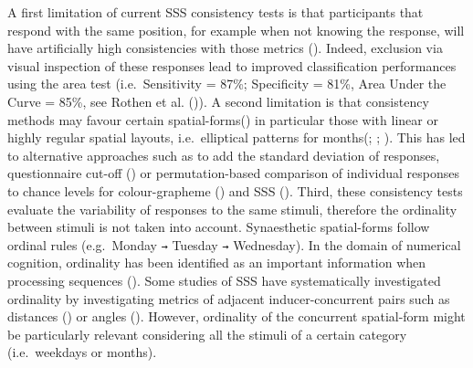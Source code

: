 \documentclass[
  man,
  floatsintext,
  longtable,
  a4paper,
  nolmodern,
  notxfonts,
  notimes,
  colorlinks=true,linkcolor=blue,citecolor=blue,urlcolor=blue]{apa7}
\begin{document}
A first limitation of current SSS consistency tests is that participants
that respond with the same position, for example when not knowing the
response, will have artificially high consistencies with those metrics
(). Indeed, exclusion via
visual inspection of these responses lead to improved classification
performances using the area test (i.e.~Sensitivity = 87\%; Specificity =
81\%, Area Under the Curve = 85\%, see Rothen et al.
()).
A second limitation is that consistency methods may favour certain
spatial-forms() in particular
those with linear or highly regular spatial layouts, i.e.~elliptical
patterns for months(;
;
). This has led to
alternative approaches such as to add the standard deviation of
responses, questionnaire cut-off () or permutation-based comparison of individual responses to chance
levels for colour-grapheme ()
and SSS (). Third, these consistency
tests evaluate the variability of responses to the same stimuli,
therefore the ordinality between stimuli is not taken into account.
Synaesthetic spatial-forms follow ordinal rules (e.g.~Monday \texttt{→}
Tuesday \texttt{→} Wednesday). In the domain of numerical cognition,
ordinality has been identified as an important information when
processing sequences ().
Some studies of SSS have systematically investigated ordinality by
investigating metrics of adjacent inducer-concurrent pairs such as
distances () or angles
(). However, ordinality of
the concurrent spatial-form might be particularly relevant considering
all the stimuli of a certain category (i.e.~weekdays or months).
\end{document}
